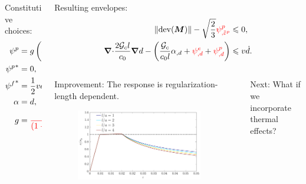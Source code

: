 \begin{frame}
\begin{overlayarea}{\textwidth}{0.4\textwidth}
{\begin{columns}
\begin{column}{0.4\textwidth}
          Constitutive choices:
          \begin{align*}
            \psi^p     & = g \left( \sigma_y \ep + \dfrac{1}{2} H \ep^2 \right),     \\
            {\psi^p}^* & = 0,                                                        \\
            {\psi^f}^* & = \dfrac{1}{2} v \dot{d}^2,                                 \\
            \alpha     & = d,                                                        \\
            g          & = \textcolor{red}{\dfrac{(1-d)^2}{(1-d)^2 + m d (1-0.5d)}}. 
          \end{align*}
        \end{column}
        \begin{column}{0.6\textwidth}
          Resulting envelopes:
          \begin{align*}
            \norm{\dev(\bfM)} - \sqrt{\dfrac{2}{3}} \textcolor{red}{ \psi^p_{,\ep}}                                                                               & \leqslant 0,         \\
            \divergence \dfrac{2\Gc l}{c_0} \grad d - \left( \dfrac{\Gc}{c_0 l} \alpha_{,d} + \textcolor{red}{\psi^e_{,d}} + \textcolor{red}{\psi^p_{,d}} \right) & \leqslant v \dot{d}. 
          \end{align*}
          \begin{columns}
            \begin{column}[t]{0.5\textwidth}
              Improvement: The response is regularization-length dependent.
              \begin{figure}
                \centering
                \includegraphics[width=0.9\textwidth]{theory/figures/Chapter5-homogenized-compare_degradation-EPPD_lorentz}
              \end{figure}
            \end{column}
            \begin{column}[t]{0.5\textwidth}
              Next: What if we incorporate thermal effects?
            \end{column}
          \end{columns}
        \end{column}
      \end{columns}
    }
    

\end{overlayarea}
\end{frame}
